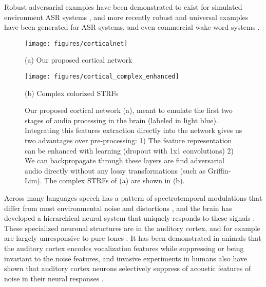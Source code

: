 \documentclass{article}
\begin{document}
Robust adversarial examples have been demonstrated to exist for simulated environment ASR systems \cite{qin_2019}, and more recently robust and universal examples have been generated for ASR systems, and even commercial wake word systems \cite{adv_music}. %
%
\begin{figure*}[t!]
	\begin{minipage}[b]{.7\linewidth}
		\centering
		\centerline{\texttt{[image: figures/corticalnet]}}
		\centerline{(a) Our proposed cortical network}\medskip
	\end{minipage}
	\hfill
	\begin{minipage}[b]{0.29\linewidth}
		\centering
		\centerline{\texttt{[image: figures/cortical\_complex\_enhanced]}}
		\vspace{.75cm}
		\centerline{(b) Complex colorized STRFs}\medskip
	\end{minipage}
	
	\caption{Our proposed cortical network (a), meant to emulate the first two stages of audio processing in the brain (labeled in light blue). Integrating this features extraction directly into the network gives us two advantages over pre-processing: 1) The feature representation can be enhanced with learning (dropout with 1x1 convolutions) 2) We can backpropagate through these layers are find adversarial audio directly without any lossy transformations (such as Griffin-Lim). The complex STRFs of (a) are shown in (b).}
	\label{fig:cortical_net}
\end{figure*}
Across many languages speech has a pattern of spectrotemporal modulations that differ from most environmental noise and distortions \cite{ding_2017}, and the brain has developed a hierarchical neural system that uniquely responds to these signals \cite{lyon_book}.
These specialized neuronal structures are in the auditory cortex, and for example are largely unresponsive to pure tones \cite{lyon_book}.
It has been demonstrated in animals that the auditory cortex encodes vocalization features while suppressing or being invariant to the noise features, and invasive experiments in humans also have shown that auditory cortex neurons selectively suppress of acoustic features of noise in their neural responses \cite{khalighinejad_2019}. %
%
\end{document}
